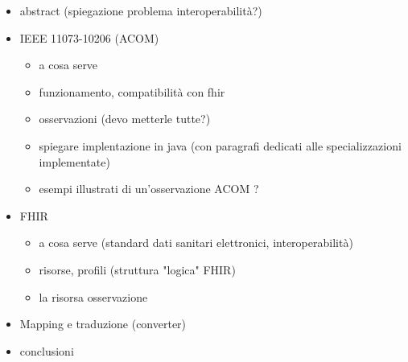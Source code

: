 \documentclass[a4paper]{article}
\begin{document}
        \begin{itemize}
            \item abstract (spiegazione problema interoperabilità?)
            \item IEEE 11073-10206 (ACOM)
            \begin{itemize}
                \item a cosa serve
                \item funzionamento, compatibilità con fhir 
                \item osservazioni (devo metterle tutte?)
                \item spiegare implentazione in java (con paragrafi dedicati alle specializzazioni implementate)
                \item esempi illustrati di un'osservazione ACOM ?
            \end{itemize}
            \item FHIR
                \begin{itemize}
                    \item a cosa serve (standard dati sanitari elettronici, interoperabilità)
                    \item risorse, profili (struttura "logica" FHIR)
                    \item la risorsa osservazione
                \end{itemize}
            \item Mapping e traduzione (converter)
            \item conclusioni
        \end{itemize}
        
\end{document}
